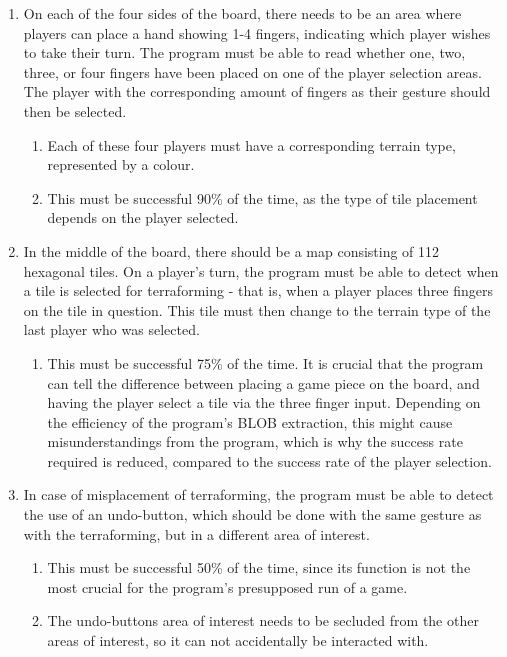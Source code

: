 \begin{enumerate}
\item On each of the four sides of the board, there needs to be an area where players can place a hand showing 1-4 fingers, indicating which player wishes to take their turn. The program must be able to read whether one, two, three, or four fingers have been placed on one of the player selection areas. The player with the corresponding amount of fingers as their gesture should then be selected.
	\begin{enumerate}
	\item Each of these four players must have a corresponding terrain type, represented by a colour.
	\item This must be successful 90\% of the time, as the type of tile placement depends on the player selected.
	\end{enumerate}
\item In the middle of the board, there should be a map consisting of 112 hexagonal tiles. On a player's turn, the program must be able to detect when a tile is selected for terraforming - that is, when a player places three fingers on the tile in question. This tile must then change to the terrain type of the last player who was selected.
	\begin{enumerate}
	\item This must be successful 75\% of the time. It is crucial that the program can tell the difference between placing a game piece on the board, and having the player select a tile via the three finger input. Depending on the efficiency of the program’s BLOB extraction, this might cause misunderstandings from the program, which is why the success rate required is reduced, compared to the success rate of the player selection.
	\end{enumerate}
\item In case of misplacement of terraforming, the program must be able to detect the use of an undo-button, which should be done with the same gesture as with the terraforming, but in a different area of interest.
	\begin{enumerate}
	\item This must be successful 50\% of the time, since its function is not the most crucial for the program’s presupposed run of a game.
	\item The undo-buttons area of interest needs to be secluded from the other areas of interest, so it can not accidentally be interacted with. 
	\end{enumerate}

\end{enumerate}
